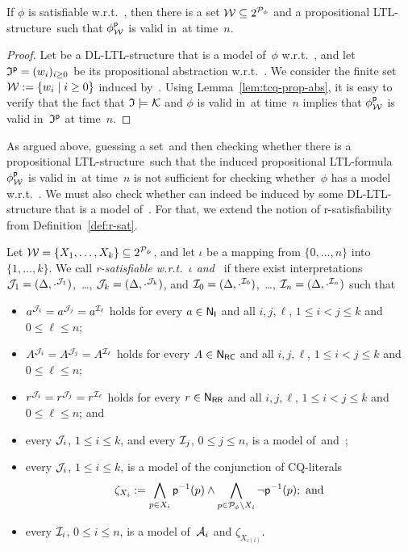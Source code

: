 \begin{lemma}\label{lem:tcq-prop-abs-wmc}
    If $\phi$ is satisfiable w.r.t.~\Kmc, then there is a set
    $\mathcal{W}\subseteq 2^{\mathcal{P}_\phi}$ and a propositional LTL-structure~\Wmf such
    that $\phi^\mathsf{p}_\mathcal{W}$ is valid in~\Wmf at time~$n$.
\end{lemma}

\begin{proof}
    Let \Imf be a DL-LTL-structure that is a model of~$\phi$ w.r.t.~\Kmc, and
    let $\mathfrak{I}^\mathsf{p}=(w_i)_{i\ge 0}$ be its propositional abstraction w.r.t.~\psf.
    We consider the finite set $\mathcal{W}:=\{w_i\mid i\ge 0\}$ induced by~\Imf.
    Using Lemma~\ref{lem:tcq-prop-abs}, it is easy to verify that the fact that
    $\mathfrak{I}\models\mathcal{K}$ and $\phi$ is valid in~\Imf at time~$n$ implies that
    $\phi^\mathsf{p}_\mathcal{W}$ is valid in~$\mathfrak{I}^\mathsf{p}$ at time~$n$.
\end{proof}

\noindent
As argued above, guessing a set~\Wmc and then checking whether there is a
propositional LTL-structure~\Wmf such that the induced propositional
LTL-formula~$\phi^\mathsf{p}_\mathcal{W}$ is valid in~\Wmf at time~$n$ is not sufficient for
checking whether~$\phi$ has a model w.r.t.~\Kmc.  We must also check whether
\Wmc can indeed be induced by some DL-LTL-structure that is a model of~\Kmc.
For that, we extend the notion of r-satisfiability from
Definition~\ref{def:r-sat}.

\begin{definition}[R-satisfiability]\label{def:tcq-r-sat}
    Let $\mathcal{W}=\{X_1,\dots,X_k\}\subseteq 2^{\mathcal{P}_\phi}$, and let $\iota$ be a
    mapping from $\{0,\dots,n\}$ into $\{1,\dots,k\}$.  We call \Wmc
    \emph{r-satisfiable w.r.t.~$\iota$ and~\Kmc} if there exist interpretations
    $\mathcal{J}_1=(\Delta,\cdot^{\mathcal{J}_1})$,~\dots, $\mathcal{J}_k=(\Delta,\cdot^{\mathcal{J}_k})$,
    and $\mathcal{I}_0=(\Delta,\cdot^{\mathcal{I}_0})$,~\dots,
    $\mathcal{I}_n=(\Delta,\cdot^{\mathcal{I}_n})$ such that
    \begin{itemize}
        \item $a^{\mathcal{J}_i}=a^{\mathcal{J}_j}=a^{\mathcal{I}_\ell}$ holds for every $a\in\mathsf{N_I}$
            and all $i,j,\ell$, $1\le i<j\le k$ and $0\le\ell\le n$;
        \item $A^{\mathcal{J}_i}=A^{\mathcal{J}_j}=A^{\mathcal{I}_\ell}$ holds for every $A\in\mathsf{N_{RC}}$
            and all $i,j,\ell$, $1\le i<j\le k$ and $0\le\ell\le n$;
        \item $r^{\mathcal{J}_i}=r^{\mathcal{J}_j}=r^{\mathcal{I}_\ell}$ holds for every $r\in\mathsf{N_{RR}}$
            and all $i,j,\ell$, $1\le i<j\le k$ and $0\le\ell\le n$; and
        \item every $\mathcal{J}_i$, $1\le i\le k$, and every $\mathcal{I}_j$, $0\le j\le n$,
            is a model of~\Tmc and~\Rmc;
        \item every $\mathcal{J}_i$, $1\le i\le k$, is a model of the conjunction of
            CQ-literals
            \[\zeta_{X_i}:=\bigwedge_{p\in X_i}\psf^{-1}(p)\land%
                \bigwedge_{p\in\Pmc_\phi\setminus X_i}\lnot\psf^{-1}(p);\ \text{and}\]
        \item every $\mathcal{I}_i$, $0\le i\le n$, is a model of~$\mathcal{A}_i$ and
            $\zeta_{X_{\iota(i)}}$.
    \end{itemize}
\end{definition}

